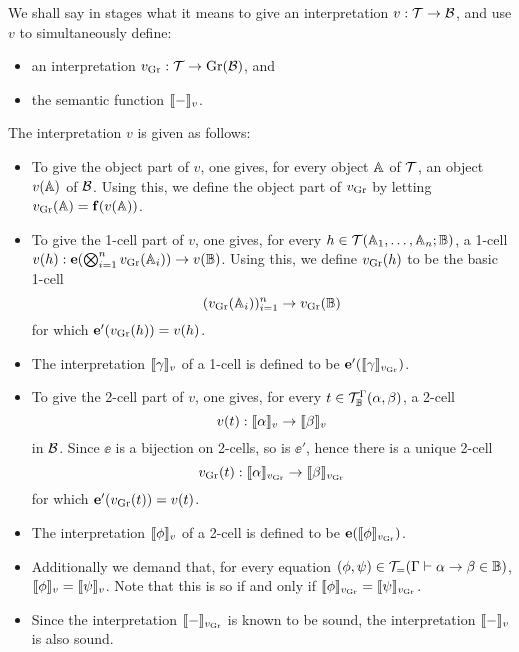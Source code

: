 \documentclass{robinthesisdraft}
\begin{document}
We shall say in stages what it means to give an interpretation $v: {\mathcal{T}}\to\mathcal{B}$,
and use $v$ to simultaneously define:
\begin{itemize}
	\item an interpretation $v_{\mathrm{Gr}}: {\mathcal{T}} \to \mathrm{Gr}(\mathcal{B})$, and
	\item the semantic function $\semint{-}$.
\end{itemize}
The interpretation $v$ is given as follows:
\begin{itemize}
	\item To give the object part of $v$, one gives, for every
	object $\mathbb{A}$ of ${\mathcal{T}}$, an object $v(\mathbb{A})$ of $\mathcal{B}$. Using
	this, we define the object part of $v_{\mathrm{Gr}}$ by letting
	$v_{\mathrm{Gr}}(\mathbb{A}) = \mathbf{f}(v(\mathbb{A}))$.
	\item To give the 1-cell part of $v$, one gives,
	for every $h\in{\mathcal{T}}(\mathbb{A}_{1}, \dots, \mathbb{A}_{n}; \mathbb{B})$,
	a 1-cell $v(h): \mathbf{e}(\bigotimes_{i=1}^{n}v_{\mathrm{Gr}}(\mathbb{A}_{i})) \to v(\mathbb{B})$.
	Using this, we define $v_{\mathrm{Gr}}(h)$ to be the basic 1-cell
	\[
		(v_{\mathrm{Gr}}(\mathbb{A}_{i}))_{i=1}^{n} \to v_{\mathrm{Gr}}(\mathbb{B})
	\]
	for which $\mathbf{e}'(v_{\mathrm{Gr}}(h)) = v(h)$.
	\item The interpretation $\semint{\gamma}$ of a 1-cell is
	defined to be $\ee'(\semint[v_{\Gr}]{\gamma})$.
	\item To give the 2-cell part of $v$, one gives,
	for every $t \in {\mathcal{T}}^{\Gamma}_{\mathbb{B}}(\alpha, \beta)$,
	a 2-cell
	\[
		v(t): \semint{\alpha} \to \semint{\beta}
	\] in $\mathcal{B}$.
	Since $\ee$ is a bijection on 2-cells, so is $\ee'$, hence there is a unique 2-cell
	\[
		v_{\Gr}(t): \semint[v_{\Gr}]{\alpha} \to \semint[v_{\Gr}]{\beta}
	\]
	for which $\mathbf{e}'(v_{\mathrm{Gr}}(t)) = v(t)$.
	\item The interpretation $\semint{\phi}$ of a 2-cell is
	defined to be $\ee(\semint[v_{\Gr}]{\phi})$.
	\item Additionally we demand that, for every
	equation $(\phi, \psi) \in {\mathcal{T}}_{=}(\Gamma\vdash\alpha\to\beta\in\mathbb{B})$,
	$\semint{\phi} = \semint{\psi}$. Note that this is so if and only if
	$\semint[v_{\Gr}]{\phi} = \semint[v_{\Gr}]{\psi}$.
	\item Since the interpretation $\semint[v_{\Gr}]{-}$ is known to be sound,
	the interpretation $\semint{-}$ is also sound.
\end{itemize}
\end{document}
